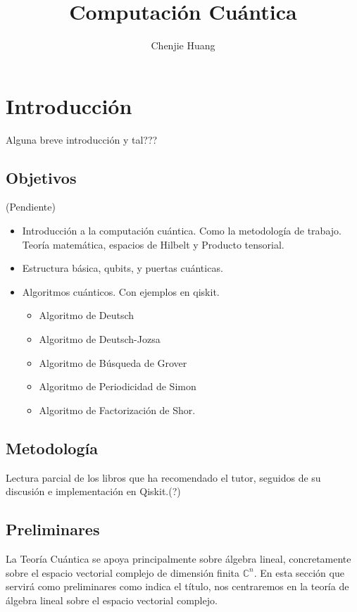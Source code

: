 \documentclass[a4paper]{article}
\title{Computación Cuántica}
\author{Chenjie Huang}
\date{}
\numberwithin{equation}{section}
\begin{document}
\maketitle

\tableofcontents

\newpage

\thispagestyle{empty}

\newpage

\section{Introducción}

Alguna breve introducción y tal???

\subsection{Objetivos}

(Pendiente)

\begin{itemize}
\item Introducción a la computación cuántica. Como la metodología de trabajo. Teoría matemática, espacios de Hilbelt y Producto tensorial.

\item Estructura básica, qubits, y puertas cuánticas.

\item Algoritmos cuánticos. Con ejemplos en qiskit.

\begin{itemize}
	\item Algoritmo de Deutsch
	\item Algoritmo de Deutsch-Jozsa
	\item Algoritmo de Búsqueda de Grover
	\item Algoritmo de Periodicidad de Simon
	\item Algoritmo de Factorización de Shor.
\end{itemize}

\end{itemize}

\subsection{Metodología}
Lectura parcial de los libros que ha recomendado el tutor, seguidos de su discusión e implementación en Qiskit.(?)

\subsection{Preliminares}
La Teoría Cuántica se apoya principalmente sobre álgebra lineal, concretamente sobre el espacio vectorial complejo de dimensión finita $\mathbb{C}^n$.
En esta sección que servirá como preliminares como indica el título, nos centraremos en la teoría de álgebra lineal sobre el espacio vectorial complejo. 
\end{document}
